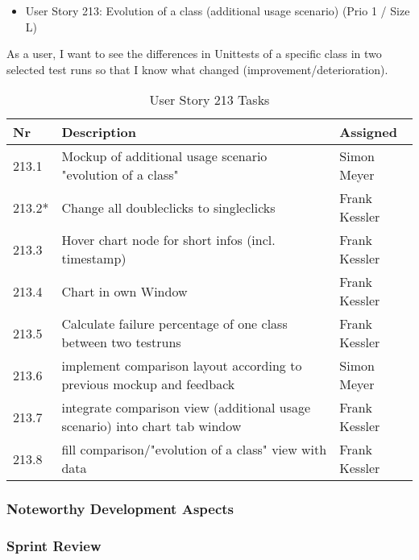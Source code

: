 \begin{itemize}
	\item User Story 213: Evolution of a class (additional usage scenario) (Prio 1 / Size L)
	\end{itemize}
As a user,
I want to see the differences in Unittests of a specific class in two selected test runs
so that I know what changed (improvement/deterioration).
\begin{table}[h]
  \caption{User Story 213 Tasks}
  \label{Story 213 Tasks}
  \centering
  \begin{tabular}{p{1cm}|p{5cm}|p{3cm}|}
  	Nr & Description & Assigned \\ 
  	\hline
  	213.1 & Mockup of additional usage scenario "evolution of a class" & Simon Meyer \\ 
  	\hline
  	213.2* & Change all doubleclicks to singleclicks & Frank Kessler \\ 
  	\hline
  	213.3 & Hover chart node for short infos (incl. timestamp) & Frank Kessler \\ 
  	\hline
  	213.4 & Chart in own Window & Frank Kessler \\ 
  	\hline
  	213.5 & Calculate failure percentage of one class between two testruns & Frank Kessler \\ 
  	\hline
  	213.6 & implement comparison layout according to previous mockup and feedback & Simon Meyer \\ 
  	\hline
  	213.7 & integrate comparison view (additional usage scenario) into chart tab window & Frank Kessler \\ 
  	\hline
  	213.8 & fill comparison/"evolution of a class" view with data & Frank Kessler \\ 
  	\hline
  \end{tabular}
\end{table}


\subsubsection*{Noteworthy Development Aspects}

\subsubsection*{Sprint Review}


